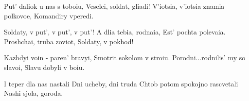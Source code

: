 
\beginverse
Put' daliok u nas s toboiu,
Veselei, soldat, gliadi!
V'iotsia, v'iotsia znamia polkovoe,
Komandiry vperedi.
\endverse

\beginchorus
Soldaty, v put', v put', v put'!
A dlia tebia, rodnaia,
Est' pochta polevaia.
Proshchai, truba zoviot,
Soldaty, v pokhod!
\endchorus

\beginverse
Kazhdyi voin - paren' bravyi,
Smotrit sokolom v stroiu.
Porodni...rodnilis' my so slavoi,
Slavu dobyli v boiu.
\endverse

\beginverse
I teper dla nas nastali
Dni ucheby, dni truda
Chtob potom spokojno rascvetali
Nashi sjola, goroda.
\endverse

\endsong
